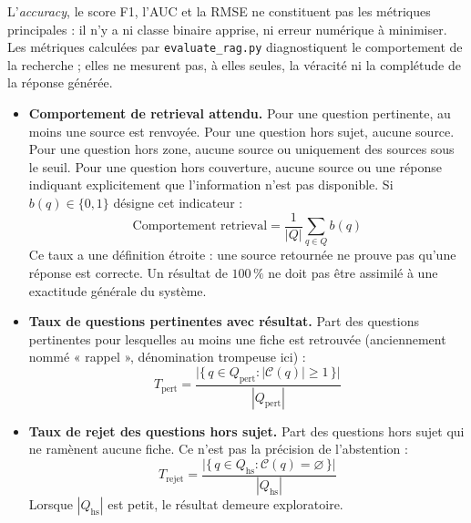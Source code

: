 L'\textit{accuracy}, le score F1, l'AUC et la RMSE ne constituent pas les
métriques principales : il n'y a ni classe binaire apprise, ni erreur numérique
à minimiser. Les métriques calculées par \texttt{evaluate\_rag.py} diagnostiquent
le comportement de la recherche ; elles ne mesurent pas, à elles seules, la
véracité ni la complétude de la réponse générée.

\begin{itemize}
    \item \textbf{Comportement de retrieval attendu.} Pour une question
    pertinente, au moins une source est renvoyée. Pour une question hors sujet,
    aucune source. Pour une question hors zone, aucune source ou uniquement des
    sources sous le seuil. Pour une question hors couverture, aucune source ou
    une réponse indiquant explicitement que l'information n'est pas disponible.
    Si $b(q) \in \{0,1\}$ désigne cet indicateur :
    \begin{equation}
        \text{Comportement retrieval} =
        \frac{1}{|Q|} \sum_{q \in Q} b(q)
        \label{eq:comportement}
    \end{equation}
    Ce taux a une définition étroite : une source retournée ne prouve pas qu'une
    réponse est correcte. Un résultat de $100\,\%$ ne doit pas être assimilé à
    une exactitude générale du système.

    \item \textbf{Taux de questions pertinentes avec résultat.} Part des
    questions pertinentes pour lesquelles au moins une fiche est retrouvée
    (anciennement nommé « rappel », dénomination trompeuse ici) :
    \begin{equation}
        T_{\text{pert}} =
        \frac{\big|\{\, q \in Q_{\text{pert}} : |\mathcal{C}(q)| \ge 1 \,\}\big|}
             {|Q_{\text{pert}}|}
        \label{eq:taux_pert}
    \end{equation}

    \item \textbf{Taux de rejet des questions hors sujet.} Part des questions
    hors sujet qui ne ramènent aucune fiche. Ce n'est pas la précision de
    l'abstention :
    \begin{equation}
        T_{\text{rejet}} =
        \frac{\big|\{\, q \in Q_{\text{hs}} : \mathcal{C}(q) = \varnothing \,\}\big|}
             {|Q_{\text{hs}}|}
        \label{eq:taux_rejet}
    \end{equation}
    Lorsque $|Q_{\text{hs}}|$ est petit, le résultat demeure exploratoire.


\end{itemize}
